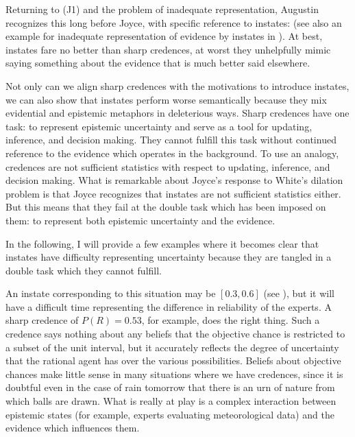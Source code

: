 \documentclass[11pt]{article}
\begin{document}
Returning to (J1) and the problem of inadequate representation,
Augustin recognizes this long before Joyce, with specific reference to
instates:   (see
also an example for inadequate representation of evidence by instates
in ). At best, instates fare no better
than sharp credences, at worst they unhelpfully mimic saying something
about the evidence that is much better said elsewhere.

Not only can we align sharp credences with the motivations to
introduce instates, we can also show that instates perform worse
semantically because they mix evidential and epistemic metaphors in
deleterious ways. Sharp credences have one task: to represent
epistemic uncertainty and serve as a tool for updating, inference, and
decision making. They cannot fulfill this task without continued
reference to the evidence which operates in the background. To use an
analogy, credences are not sufficient statistics with respect to
updating, inference, and decision making. What is remarkable about
Joyce's response to White's dilation problem is that Joyce recognizes
that instates are not sufficient statistics either. But this means
that they fail at the double task which has been imposed on them: to
represent both epistemic uncertainty and the evidence.

In the following, I will provide a few examples where it becomes clear
that instates have difficulty representing uncertainty because they
are tangled in a double task which they cannot fulfill.


An instate corresponding to this situation may be $[0.3,0.6]$ (see
), but it will have a difficult time
representing the difference in reliability of the experts. A sharp
credence of $P(R)=0.53$, for example, does the right thing. Such a
credence says nothing about any beliefs that the objective chance is
restricted to a subset of the unit interval, but it accurately
reflects the degree of uncertainty that the rational agent has over
the various possibilities. Beliefs about objective chances make little
sense in many situations where we have credences, since it is doubtful
even in the case of rain tomorrow that there is an urn of nature from
which balls are drawn. What is really at play is a complex interaction
between epistemic states (for example, experts evaluating
meteorological data) and the evidence which influences them.
\end{document}
